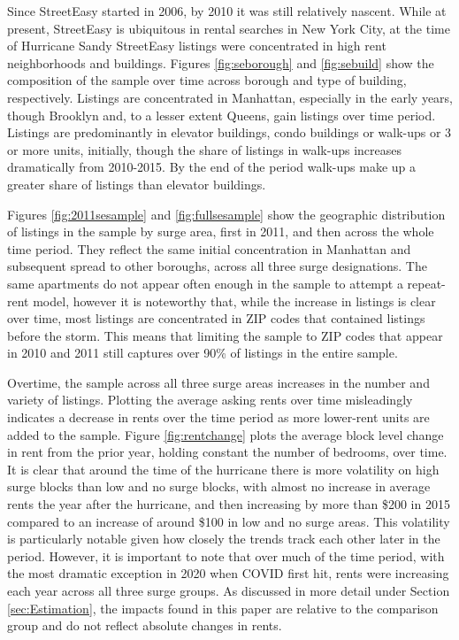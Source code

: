 \documentclass[12pt]{article}
\begin{document}
{{{{Since StreetEasy started in 2006, by 2010 it was still relatively nascent.  While at present, StreetEasy is ubiquitous in rental searches in New York City, at the time of Hurricane Sandy StreetEasy listings were concentrated in high rent neighborhoods and buildings.  Figures \ref{fig:seborough} and \ref{fig:sebuild} show the composition of the sample over time across borough and type of building, respectively. Listings are concentrated in Manhattan, especially in the early years, though Brooklyn and, to a lesser extent Queens, gain listings over time period.  Listings are predominantly in elevator buildings, condo buildings or walk-ups or 3 or more units, initially, though the share of listings in walk-ups increases dramatically from 2010-2015.  By the end of the period walk-ups make up a greater share of listings than elevator buildings. 

Figures \ref{fig:2011sesample} and \ref{fig:fullsesample} show the geographic distribution of listings in the sample by surge area, first in 2011, and then across the whole time period.  They reflect the same initial concentration in Manhattan and subsequent spread to other boroughs, across all three surge designations. The same apartments do not appear often enough in the sample to attempt a repeat-rent model, however it is noteworthy that, while the increase in listings is clear over time, most listings are concentrated in ZIP codes that contained listings before the storm.  This means that limiting the sample to ZIP codes that appear in 2010 and 2011 still captures over 90\% of listings in the entire sample.

Overtime, the sample across all three surge areas increases in the number and variety of listings. Plotting the average asking rents over time misleadingly indicates a decrease in rents over the time period as more lower-rent units are added to the sample.  Figure \ref{fig:rentchange} plots the average block level change in rent from the prior year, holding constant the number of bedrooms, over time. It is clear that around the time of the hurricane there is more volatility on high surge blocks than low and no surge blocks, with almost no increase in average rents the year after the hurricane, and then increasing by more than \$200 in 2015 compared to an increase of around \$100  in low and no surge areas.  This volatility is particularly notable given how closely the trends track each other later in the period. However, it is important to note that over much of the time period, with the most dramatic exception in 2020 when COVID first hit, rents were increasing each year across all three surge groups.  As discussed in more detail under Section \ref{sec:Estimation}, the impacts found in this paper are relative to the comparison group and do not reflect absolute changes in rents.


}}}}
\end{document}
